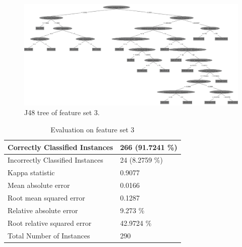 \begin{figure}[htb]
	\centering
  \includegraphics[width=\textwidth]{images/weka/weka_tree_3.png}
	\caption{J48 tree of feature set 3.}
	\label{fig:wekaTree3}
\end{figure}

\begin{table}
  \footnotesize
  \caption{Evaluation on feature set 3}
  \label{tab:WekaEval3} 
	\centering
	\begin{tabular}[c]{|l|l|}
	  \hline
		Correctly Classified Instances   &     266 (91.7241 \%) \\
	  \hline
Incorrectly Classified Instances    &    24 (8.2759 \%) \\
	  \hline
Kappa statistic      &                    0.9077 \\
	  \hline
Mean absolute error    &                  0.0166 \\
	  \hline
Root mean squared error  &                0.1287 \\
	  \hline
Relative absolute error  &               9.273 \% \\
	  \hline
Root relative squared error   &          42.9724 \% \\
	  \hline
Total Number of Instances    &          290 \\
	  \hline
	\end{tabular}
\end{table}

